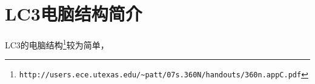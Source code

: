 \section{LC3电脑结构简介}
LC3的电脑结构\footnote{\nolinkurl{http://users.ece.utexas.edu/~patt/07s.360N/handouts/360n.appC.pdf}}较为简单，
